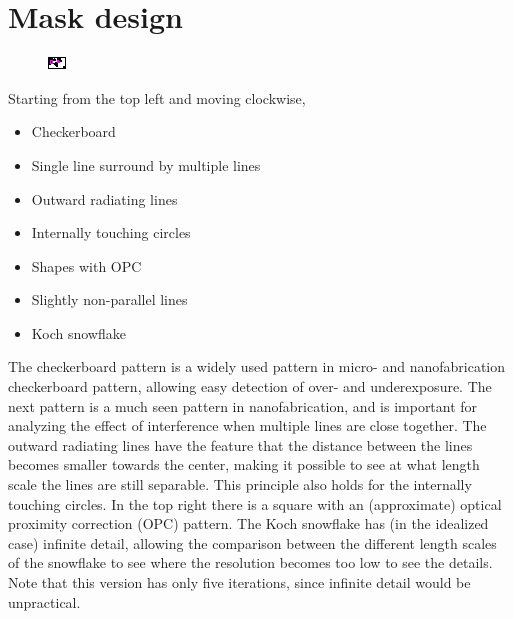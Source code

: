 \section{Mask design}
\begin{figure}[H]
    \centering
    \includegraphics[trim=0mm 0.12mm 0.17mm 0mm, clip=true,width=\linewidth]{figures/litho_design.pdf}
    \label{fig:litho_design}
\end{figure} 

Starting from the top left and moving clockwise,

\begin{itemize}
    \item Checkerboard
    \item Single line surround by multiple lines
    \item Outward radiating lines
    \item Internally touching circles
    \item Shapes with OPC
    \item Slightly non-parallel lines
    \item Koch snowflake
\end{itemize}

The checkerboard pattern is a widely used pattern in micro- and nanofabrication checkerboard pattern, allowing easy detection of over- and underexposure. The next pattern is a much seen pattern in nanofabrication, and is important for analyzing the effect of interference when multiple lines are close together. The outward radiating lines have the feature that the distance between the lines becomes smaller towards the center, making it possible to see at what length scale the lines are still separable. This principle also holds for the internally touching circles. In the top right there is a square with an (approximate) optical proximity correction (OPC) pattern. The Koch snowflake has (in the idealized case) infinite detail, allowing the comparison between the different length scales of the snowflake to see where the resolution becomes too low to see the details. Note that this version has only five iterations, since infinite detail would be unpractical.

